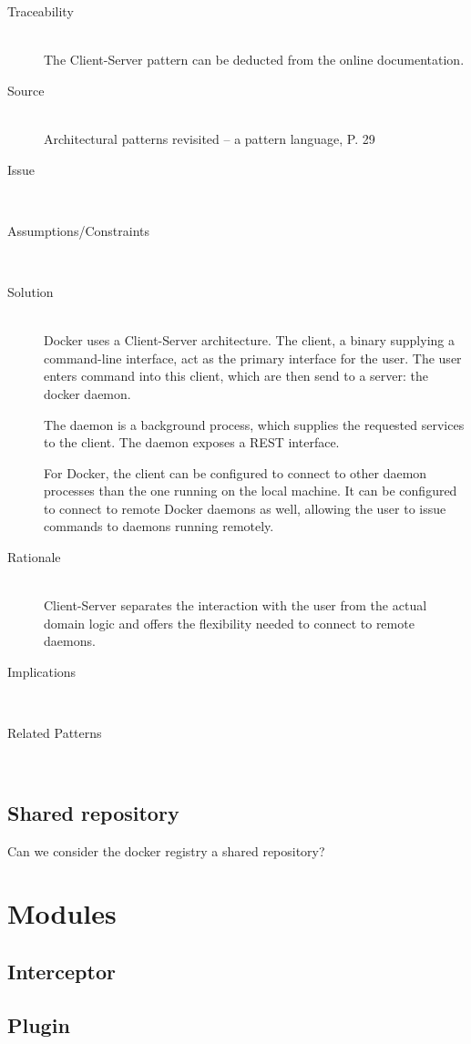 \begin{description}
\item [Traceability]~\\
The Client-Server pattern can be deducted from the online documentation\cite{dockerarchi}.

\item [Source]~\\
Architectural patterns revisited -- a pattern language, P. 29 \cite{avgeriou2005architectural}

\item [Issue]~\\

\item [Assumptions/Constraints]~

\item [Solution]~\\
Docker uses a Client-Server architecture. The client, a binary supplying a command-line interface, act as the primary interface for the user. The user enters command into this client, which are then send to a server: the docker daemon. 

The daemon is a background process, which supplies the requested services to the client. The daemon exposes a REST interface.

For Docker, the client can be configured to connect to other daemon processes than the one running on the local machine. It can be configured to connect to remote Docker daemons as well, allowing the user to issue commands to daemons running remotely.

\item [Rationale] ~\\
Client-Server separates the interaction with the user from the actual domain logic and offers the flexibility needed to connect to remote daemons. %

\item [Implications]~\\


\item [Related Patterns]~\\


\end{description}

\subsection{Shared repository}
Can we consider the docker registry a shared repository?




\section{Modules}
\subsection{Interceptor}
\subsection{Plugin}

